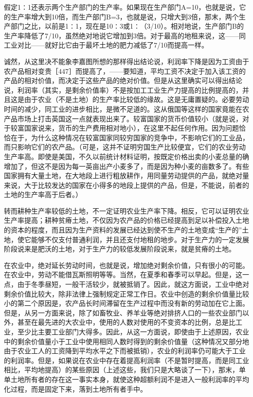 假定1∶1还表示两个生产部门的生产率。如果现在生产部门A=10，也就是说，它的生产率增大到10倍，而生产部门B=3，也就是说，只增大到3倍，那末，两个生产部门之比，以前是1∶1，现在是10∶3或1∶（3/10）。相对地说，生产部门B的生产率降低了7/10，虽然绝对地说它增加到3倍。对于最高的地租来说，这——同工业对比——就好比它由于最坏土地的肥力减低了7/10而提高一样。

诚然，从这里决不能象李嘉图所想的那样得出结论说，利润率下降是因为工资由于农产品相对变贵［447］而提高了，——要知道，平均工资不决定于加入该工资的产品的相对价值，而决定于这些产品的绝对价值。但是从这里确实可以得出结论说，利润率（其实，是剩余价值率）不是按加工工业生产力提高的比例提高的，并且这是由于农业（不是土地）的生产率比较低的缘故。这是无庸置疑的。必要劳动时间的减少，同工业的进步相比，是微不足道的。这从俄国等这样的国家竟能在农产品市场上打击英国这一点就表现出来了。较富国家的货币价值较小（就是说，对于较富国家说来，货币的生产费用相对地小），在这里不起任何作用。因为问题恰恰在于，为什么这种情况在较富国家同较穷国家的竞争中，不影响它们的工业品，而只影响它们的农产品。（可是，这并不证明穷国生产比较便宜，它们的农业劳动生产率高。即使是美国，不久以前统计材料证明，按既定价格出卖的小麦总量的确增加了，但这不是因为每一英亩出产小麦多了，而是因为种小麦的亩数多了。有些国家拥有大量土地，在大地段上进行粗放耕作，用同量劳动提供的产品，就绝对量来说，大于比较发达的国家在小得多的地段上提供的产品，但是，不能说，前者的土地的生产率高于后者。）

转而耕种生产率较低的土地，不一定证明农业生产率下降。相反，它可以证明农业生产率提高；耕种贫瘠土地，不仅因为农产品的价格已经提高到足以补偿投入土地的资本的程度，而且因为生产资料的发展已经达到使不生产的土地变成“生产的”土地，使它能够不仅支付普通利润，并且还支付地租的地步。对于生产力的一定发展阶段说来是肥沃的土地，对于生产力的较低发展阶段说来，就是贫瘠的土地。

在农业中，绝对延长劳动时间，也就是说，增加绝对剩余价值，只有很小的可能。在农业中，劳动不能借瓦斯照明等等。当然，在夏季和春季可以早起。但是，这一点，由于冬季昼短，一般干活较少，就被抵销了。因此，就这方面说，工业中绝对剩余价值比较大，除非法律上强制规定正常工作日。农业中创造的剩余价值量比较小的第二个原因是，农产品长时间滞留在生产过程中而没有新的劳动加在它上面。但是，从另一方面来说，除了如畜牧业、养羊业等绝对排挤人口的一些农业部门以外，甚至在最先进的大农业中，使用的人数对使用的不变资本的比例，总是比工业，至少比主要工业部门大得多。因此，从这一方面说，即使由于上述原因，农业中的剩余价值量小于工业中使用相同人数时得到的剩余价值量（这种情况又部分地由于农业工人的工资降到平均水平之下而被抵销），农业的利润率仍可能大于工业的利润率。但是，如果说在农业中存在着提高利润率（不是暂时提高，而是同工业相比，平均地提高）的某些原因（上述这些，我们只是大略谈了一下），那末，单单土地所有者的存在这一事实本身，就使这种超额利润不是进入一般利润率的平均化过程，而是固定下来，落到土地所有者手中。

